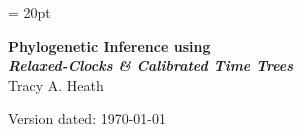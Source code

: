 \documentclass[11pt]{article}
\begin{document}
\renewcommand{\headrulewidth}{0.5pt}
\headsep = 20pt
\lhead{ }
\thispagestyle{plain}
\begin{center}

\textbf{\LARGE Phylogenetic Inference using \RevBayes}\\\vspace{2mm}
\textbf{\it{\Large Relaxed-Clocks \& Calibrated Time Trees}}\\\vspace{2mm}
\vspace{1cm}
{\Large Tracy A. Heath}
\vspace{1cm}


\end{center}

\def \ResourcePath {./}
\def \GlobalResourcePath {../}


Version dated: \today
\end{document}
